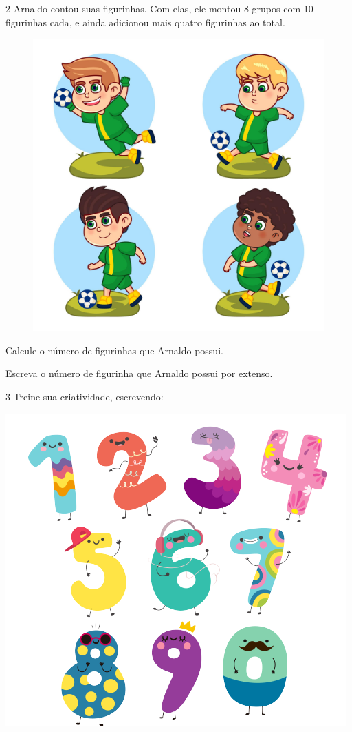 \num{2} Arnaldo contou suas figurinhas. Com elas, ele montou 8 grupos com 10 figurinhas cada, e ainda adicionou mais quatro figurinhas ao total.

\begin{figure}[htpb!]
\centering
\includegraphics[width=.6\textwidth]{./media/image2a.jpg}
\end{figure}

\begin{escolha}
\item
  Calcule o número de figurinhas que Arnaldo possui.\\

\item  Escreva o número de figurinha que Arnaldo possui por extenso.\\
\end{escolha}

\num{3} Treine sua criatividade, escrevendo:

\includegraphics[width=\textwidth]{./media/image4a.png}

